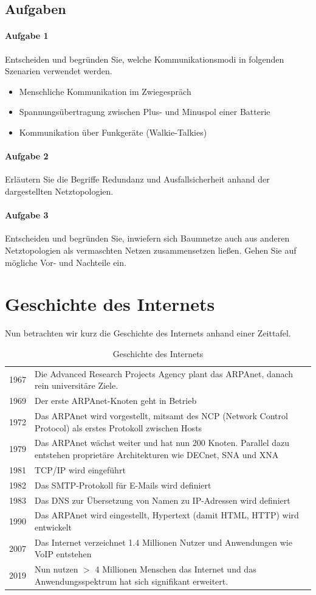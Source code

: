 \documentclass[11pt,a4paper]{scrartcl}
\begin{document}
\subsection{Aufgaben}
\paragraph{Aufgabe 1} Entscheiden und begründen Sie, welche Kommunikationsmodi in folgenden Szenarien verwendet werden.
\begin{itemize}
\item Menschliche Kommunikation im Zwiegespräch
\item Spannungsübertragung zwischen Plus- und Minuspol einer Batterie
\item Kommunikation über Funkgeräte (Walkie-Talkies)
\end{itemize}
\paragraph{Aufgabe 2} Erläutern Sie die Begriffe Redundanz und Ausfallsicherheit anhand der dargestellten Netztopologien.
\paragraph{Aufgabe 3} Entscheiden und begründen Sie, inwiefern sich Baumnetze auch aus anderen Netztopologien als vermaschten Netzen zusammensetzen ließen. Gehen Sie auf mögliche Vor- und Nachteile ein. 
\section{Geschichte des Internets}
Nun betrachten wir kurz die Geschichte des Internets anhand einer Zeittafel.
\begin{table}[h]
\centering
\begin{tabular}{cp{13cm}}
1967 & Die Advanced Research Projects Agency plant das ARPAnet, danach rein universitäre Ziele. \\
1969 & Der erste ARPAnet-Knoten geht in Betrieb \\
1972 & Das ARPAnet wird vorgestellt, mitsamt des NCP (Network Control Protocol) als erstes Protokoll zwischen Hosts \\
1979 & Das ARPAnet wächst weiter und hat nun 200 Knoten. Parallel dazu entstehen proprietäre Architekturen wie DECnet, SNA und XNA \\
1981 & TCP/IP wird eingeführt \\
1982 & Das SMTP-Protokoll für E-Mails wird definiert \\
1983 & Das DNS zur Übersetzung von Namen zu IP-Adressen wird definiert \\
1990 & Das ARPAnet wird eingestellt, Hypertext (damit HTML, HTTP) wird entwickelt \\
2007 & Das Internet verzeichnet 1.4 Millionen Nutzer und Anwendungen wie VoIP entstehen \\
2019 & Nun nutzen $>$ 4 Millionen Menschen das Internet und das Anwendungsspektrum hat sich signifikant erweitert.
\end{tabular}
\caption{Geschichte des Internets}
\end{table}
\end{document}
